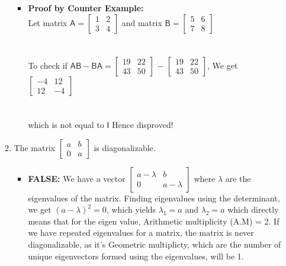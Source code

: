 \documentclass[answers, a4paper, 11pt]{exam}
\newcommand{\mat}[1]{\boldsymbol { \mathsf{#1}} }
\begin{document}
\begin{enumerate}
\begin{enumerate}
\begin{solution}
\begin{itemize}
        \item \textbf{Proof by Counter Example:}
        \newline
        \\
        Let matrix $\mat A = \begin{bmatrix}
        1 & 2 \\ 3 & 4
        \end{bmatrix}$ 
        and matrix $\mat B =  \begin{bmatrix}
        5 &6 \\ 7 & 8        \end{bmatrix}$\\ 
        \\
        \\
        To check if $ \mat A \mat B - \mat B \mat A  = \begin{bmatrix}
         19 &22 \\ 43 & 50
        \end{bmatrix}$ $-$ $\begin{bmatrix}
         19 &22 \\ 43 & 50
        \end{bmatrix}$, 
        We get $\begin{bmatrix}
         -4 &12 \\ 12 & -4
        \end{bmatrix}$
        \\
        \\
        \\
        which is not equal to $\mat I$ Hence disproved!
    \end{itemize}

    \end{solution}
    
    \item The matrix 
        $\begin{bmatrix}
        a & b \\
        0 & a
        \end{bmatrix}$ is diagonalizable.

	\begin{solution}
        \begin{itemize}
    	    \item
    	    \textbf{FALSE:}
    	    We have a vector $\begin{bmatrix}
	    a- \lambda & b
	   \\ 0 & a - \lambda	    \end{bmatrix}$
	   where $\lambda$ are the eigenvalues of the matrix.
	 Finding eigenvalues using the determinant, we get $(a-\lambda)^2 = 0 $, which yields $\lambda_1 =a $ and $\lambda_2 =a $
	 which directly means that for the eigen value, Arithmetic multiplicity (A.M) = 2. If we have repeated eigenvalues for a matrix, the matrix is never diagonalizable, as it's Geometric multiplicty, which are the number of unique eigenvectors formed using the eigenvalues, will be 1. \end{itemize}


\end{solution}
\end{enumerate}
\end{enumerate}
\end{document}
